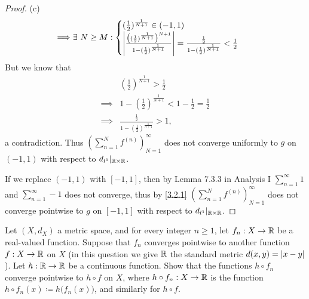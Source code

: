 \begin{proof}{(c)}
\begin{align*}
    \implies & \exists\ N \geq M : \begin{cases}
                                     (\frac{1}{2})^{\frac{1}{N + 1}} \in (-1, 1) \\
                                     \left\lvert\frac{\big((\frac{1}{2})^{\frac{1}{N + 1}}\big)^{N + 1}}{1 - (\frac{1}{2})^{\frac{1}{N + 1}}}\right\rvert = \frac{\frac{1}{2}}{1 - (\frac{1}{2})^{\frac{1}{N + 1}}} < \frac{1}{2}
                                   \end{cases}
  \end{align*}
  But we know that
  \begin{align*}
             & (\frac{1}{2})^{\frac{1}{N + 1}} > \frac{1}{2}                       \\
    \implies & 1 - (\frac{1}{2})^{\frac{1}{N + 1}} < 1 - \frac{1}{2} = \frac{1}{2} \\
    \implies & \frac{\frac{1}{2}}{1 - (\frac{1}{2})^{\frac{1}{N + 1}}} > 1,
  \end{align*}
  a contradiction.
  Thus \((\sum_{n = 1}^N f^{(n)})_{N = 1}^\infty\) does not converge uniformly to \(g\) on \((-1, 1)\) with respect to \(d_{l^1}|_{\mathbb{R} \times \mathbb{R}}\).

  If we replace \((-1, 1)\) with \([-1, 1]\), then by Lemma 7.3.3 in Analysis I \(\sum_{n = 1}^\infty 1\) and \(\sum_{n = 1}^\infty -1\) does not converge, thus by \cref{3.2.1} \((\sum_{n = 1}^N f^{(n)})_{N = 1}^\infty\) does not converge pointwise to \(g\) on \([-1, 1]\) with respect to \(d_{l^1}|_{\mathbb{R} \times \mathbb{R}}\).
\end{proof}

\begin{ex}\label{ex:3.2.3}
  Let \((X, d_X)\) a metric space, and for every integer \(n \geq 1\), let \(f_n : X \to \mathbb{R}\) be a real-valued function.
  Suppose that \(f_n\) converges pointwise to another function \(f : X \to \mathbb{R}\) on \(X\)
  (in this question we give \(\mathbb{R}\) the standard metric \(d(x, y) = \left\lvert x - y\right\rvert\)).
  Let \(h : \mathbb{R} \to \mathbb{R}\) be a continuous function.
  Show that the functions \(h \circ f_n\) converge pointwise to \(h \circ f\) on \(X\), where \(h \circ f_n : X \to \mathbb{R}\) is the function \(h \circ f_n(x) \coloneqq h\big(f_n(x)\big)\), and similarly for \(h \circ f\).
\end{ex}

